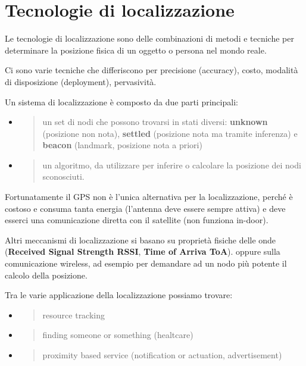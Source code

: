 \chapter{Tecnologie di localizzazione}

Le tecnologie di localizzazione sono delle combinazioni di metodi e tecniche 
per determinare la posizione fisica di un oggetto o persona nel mondo reale.

Ci sono varie tecniche che differiscono per precisione (accuracy),
costo, modalità di disposizione (deployment), pervasività.

Un sistema di localizzazione è composto da due parti principali:

\begin{itemize}
\item
  \begin{quote}
  un set di nodi che possono trovarsi in stati diversi: \textbf{unknown}
  (posizione non nota), \textbf{settled} (posizione nota ma tramite
  inferenza) e \textbf{beacon} (landmark, posizione nota a priori)
  \end{quote}
\item
  \begin{quote}
  un algoritmo, da utilizzare per inferire o calcolare la posizione dei
  nodi sconosciuti.
  \end{quote}
\end{itemize}

Fortunatamente il GPS non è l'unica alternativa per la localizzazione,
perché è costoso e consuma tanta energia (l'antenna deve essere sempre
attiva) e deve esserci una comunicazione diretta con il satellite (non
funziona in-door).

Altri meccanismi di localizzazione si basano su proprietà fisiche delle
onde (\textbf{Received Signal Strength RSSI}, \textbf{Time of Arriva
ToA}). oppure sulla comunicazione wireless, ad esempio per demandare ad
un nodo più potente il calcolo della posizione.

Tra le varie applicazione della localizzazione possiamo trovare:

\begin{itemize}
\item
  \begin{quote}
  resource tracking
  \end{quote}
\item
  \begin{quote}
  finding someone or something (healtcare)
  \end{quote}
\item
  \begin{quote}
  proximity based service (notification or actuation, advertisement)
  \end{quote}
\end{itemize}

